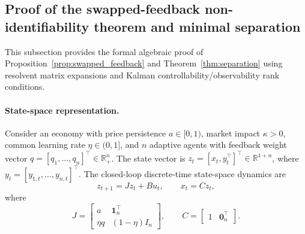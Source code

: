 \documentclass[10pt,twocolumn,letterpaper]{article}
\theoremstyle{definition}
\theoremstyle{remark}
\begin{document}
\subsection{Proof of the swapped-feedback non-identifiability theorem and minimal separation}
\label{app:group_proofs}
This subsection provides the formal algebraic proof of Proposition~\ref{prop:swapped_feedback} and Theorem~\ref{thm:separation} using resolvent matrix expansions and Kalman controllability/observability rank conditions.

\paragraph{State-space representation.}
Consider an economy with price persistence $a\in[0,1)$, market impact $\kappa>0$, common learning rate $\eta\in(0,1]$, and $n$ adaptive agents with feedback weight vector $q=[q_1,\dots,q_n]^\top\in\mathbb{R}_+^n$. The state vector is $z_t=[x_t, y_t^\top]^\top\in\mathbb{R}^{1+n}$, where $y_t=[y_{1,t},\dots,y_{n,t}]^\top$. The closed-loop discrete-time state-space dynamics are
\begin{equation}
 z_{t+1}=J z_t+B u_t,\qquad x_t=C z_t,
 \label{eq:state_space_proof}
\end{equation}
where
\begin{equation}
 J=\begin{bmatrix} a & \mathbf1_n^\top \\ \eta q & (1-\eta)I_n \end{bmatrix},\qquad
 C=\begin{bmatrix} 1 & \mathbf0_n^\top \end{bmatrix}.
\end{equation}
\end{document}
